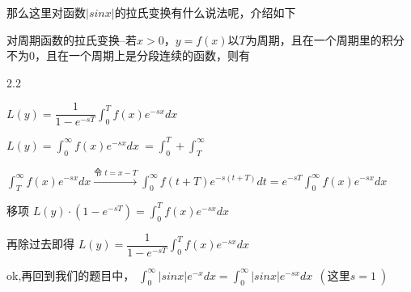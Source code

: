 \documentclass[12pt]{report}
\begin{document}
   
  那么这里对函数$|sinx|$的拉氏变换有什么说法呢，介绍如下
  
   对周期函数的拉氏变换--若$x>0$，$y=f(x)$以$T$为周期，且在一个周期里的积分不为0，且在一个周期上是分段连续的函数，则有
  
   \vspace{-10pt}
  
  \begin{spacing}{2.2}
  	\begin{center}
  		$L\left(y\right)=\dfrac{1}{1-e^{-sT}}\int_{0}^{T}f\left(x\right)e^{-sx}dx\:$
  		
  		\hspace{-4em}  \hspace{1em}	$L\left(y\right)=\int_{0}^{\infty}f\left(x\right)e^{-sx}dx\:=\int_{0}^{T}+\int_{T}^{\infty}$
  		
  		$\int_{T}^{\infty} f(x) e^{-sx} dx \xrightarrow{\text{令 } t=x-T} \int_{0}^{\infty} f(t+T) e^{-s(t+T)} dt =e^{-sT}\int_{0}^{\infty}f\left(x\right)e^{-sx}dx\:$
  		
  		\hspace{-4em} 移项 \hspace{2em} $L\left(y\right)\cdot\left(1-e^{-sT}\right)=\int_{0}^{T}f\left(x\right)e^{-sx}dx\:$
  		
  		\hspace{-8em} 再除过去即得 \hspace{2em} $L\left(y\right)=\dfrac{1}{1-e^{-sT}}\int_{0}^{T}f\left(x\right)e^{-sx}dx\:$
  	\end{center}
  \end{spacing}
  
  
  ok,再回到我们的题目中，	$\int_{0}^{\infty}\left|sinx\right|e^{-x}dx=\int_{0}^{\infty}\left|sinx\right|e^{-sx}dx\:\:\left(这里s=1\:\right)$
  
  \vspace{10pt}
  
\end{document}
